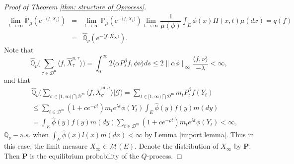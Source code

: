 \documentclass[12pt,a4paper]{amsart}
\theoremstyle{plain}
\theoremstyle{definition}
\numberwithin{equation}{section}
\begin{document}
\begin{proof}[Proof of Theorem \ref{thm: structure of Qprocess}]
\begin{eqnarray*}
\lim_{t\rightarrow\infty}\widetilde{\mathbb P}_\mu\left(e^{-\langle f, X_t\rangle}\right)&=&\lim_{t\rightarrow\infty}\mathbb P_\mu\left(e^{-\langle f, X_t\rangle}\right)
\lim_{t\to\infty}\dfrac{1}{\mu(\phi)}\int_E\phi(x)H(x, t)\mu(dx)=q(f)\\
&=&\widehat{\mathbb Q}_{\nu}\left(e^{-\langle f, X_{\infty}\rangle }\right).
\end{eqnarray*}
Note that
\[
\widehat{\mathbb Q}_{\nu}\big(\sum_{\tau\in \mathcal D^{\mathrm n}}\langle f, \widehat X_{\tau}^{{\mathrm n},\tau} \rangle \big)=\int_0^\infty2\langle \alpha P^{\beta}_sf,\phi\nu\rangle ds
\leq 2\|\alpha\phi\|_\infty\dfrac{\langle f,\nu\rangle }{-\lambda}<\infty,
\]
and that
\begin{eqnarray*}
&&\widehat{\mathbb Q}_{\nu}\Big(\sum_{\sigma\in [1,\infty)\bigcap\mathcal D^{\mathrm m}}\langle f, \widehat X_{\sigma}^{{\mathrm m},\sigma} \rangle|\mathcal G \Big)
=\sum_{t\in [1,\infty)\bigcap\mathcal D^{\mathrm m}}m_tP^{\beta}_tf( Y_t)\\
&&\leq \sum_{t\in \mathcal D^{\mathrm m}}(1+ce^{-\rho t})m_te^{\lambda t}
\phi(Y_t)\int_E\hat\phi(y)f(y)m(dy)\\
&&=\int_E\hat\phi(y)f(y)m(dy) \sum_{t\in \mathcal D^{\mathrm m}}(1+ce^{-\rho t})m_te^{\lambda t}\phi(Y_t)<\infty,
\end{eqnarray*}
$\mathbb Q_{\nu}-{\mathrm a.s.}$ when $\int_E\hat\phi(x)l(x)m(dx)<\infty$ by Lemma \ref{import lemma}.
 Thus in this case, the limit measure $X_\infty\in \mathcal M(E)$.  Denote the distribution of $X_\infty$ by $\mathbf P$.  Then $\mathbf P$
 is the equilibrium probability of the $Q$-process.



\end{proof}
\end{document}
